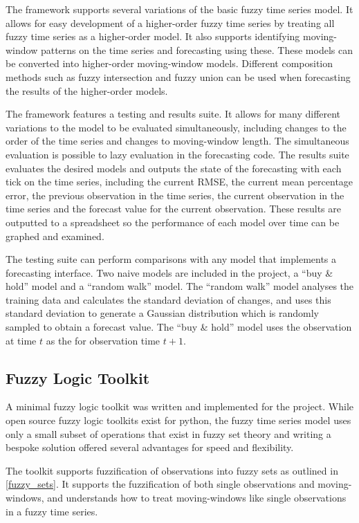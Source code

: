 \documentclass[12pt]{article}
\theoremstyle{definition}
\begin{document}
The framework supports several variations of the basic fuzzy time series model. It allows for easy development of a higher-order fuzzy time series by treating all fuzzy time series as a higher-order model. It also supports identifying moving-window patterns on the time series and forecasting using these. These models can be converted into higher-order moving-window models. Different composition methods such as fuzzy intersection and fuzzy union can be used when forecasting the results of the higher-order models.

The framework features a testing and results suite. It allows for many different variations to the model to be evaluated simultaneously, including changes to the order of the time series and changes to moving-window length. The simultaneous evaluation is possible to lazy evaluation in the forecasting code. The results suite evaluates the desired models and outputs the state of the forecasting with each tick on the time series, including the current RMSE, the current mean percentage error, the previous observation in the time series, the current observation in the time series and the forecast value for the current observation. These results are outputted to a spreadsheet so the performance of each model over time can be graphed and examined.

The testing suite can perform comparisons with any model that implements a forecasting interface. Two naive models are included in the project, a ``buy \& hold'' model and a ``random walk'' model. The ``random walk'' model analyses the training data and calculates the standard deviation of changes, and uses this standard deviation to generate a Gaussian distribution which is randomly sampled to obtain a forecast value. The ``buy \& hold'' model uses the observation at time $t$ as the for observation time $t+1$.

\subsection{Fuzzy Logic Toolkit}

A minimal fuzzy logic toolkit was written and implemented for the project. While open source fuzzy logic toolkits exist for python, the fuzzy time series model uses only a small subset of operations that exist in fuzzy set theory and writing a bespoke solution offered several advantages for speed and flexibility.

The toolkit supports fuzzification of observations into fuzzy sets as outlined in \cref{fuzzy_sets}. It supports the fuzzification of both single observations and moving-windows, and understands how to treat moving-windows like single observations in a fuzzy time series.
\end{document}
